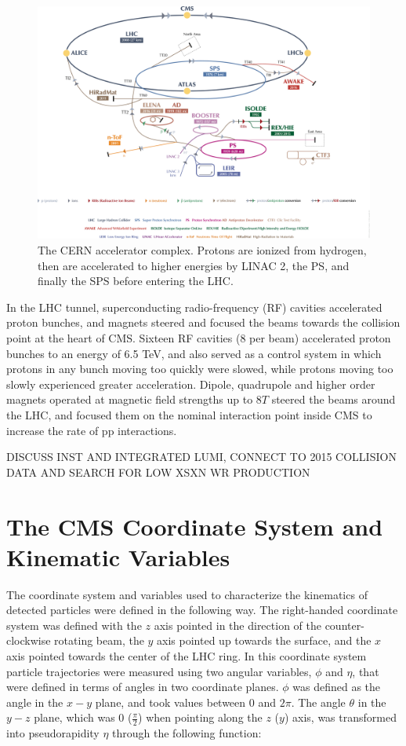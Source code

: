 \begin{figure}[ht]
	\centering
	\includegraphics[width=1\textwidth]{figures/CERNAcceleratorComplex.png}
	\caption{The CERN accelerator complex.  Protons are ionized from hydrogen, then are accelerated to higher 
	energies by LINAC 2, the PS, and finally the SPS before entering the LHC.}
	\label{fig:accelComplex}
\end{figure}


In the LHC tunnel, superconducting radio-frequency (RF) cavities accelerated proton bunches, and magnets steered and 
focused the beams towards the collision point at the heart of CMS.  Sixteen RF cavities (8 per beam) accelerated proton 
bunches to an energy of 6.5 TeV, and also served as a control system in which protons in any bunch moving too quickly 
were slowed, while protons moving too slowly experienced greater acceleration.  Dipole, quadrupole and higher order 
magnets operated at magnetic field strengths up to 8$\unit{T}$ steered the beams around the LHC, and focused them 
on the nominal interaction point inside CMS to increase the rate of pp interactions.

DISCUSS INST AND INTEGRATED LUMI, CONNECT TO 2015 COLLISION DATA AND SEARCH FOR LOW XSXN WR PRODUCTION

\section{The CMS Coordinate System and Kinematic Variables}
\label{sec:coordinateSystemAndKinematicVars}
The coordinate system and variables used to characterize the kinematics of detected particles were defined in 
the following way.  The right-handed coordinate system was defined with the $z$ axis pointed in the direction 
of the counter-clockwise rotating beam, the $y$ axis pointed up towards the surface, and the $x$ axis pointed towards 
the center of the LHC ring.  In this coordinate system particle trajectories were measured using two angular 
variables, $\phi$ and $\eta$, that were defined in terms of angles in two coordinate planes.  $\phi$ was defined 
as the angle in the $x-y$ plane, and took values between 0 and $2\pi$.  The angle $\theta$ in the $y-z$ plane, 
which was 0 ($\frac{\pi}{2}$) when pointing along the $z$ ($y$) axis, was transformed into pseudorapidity 
$\eta$ through the following function:

